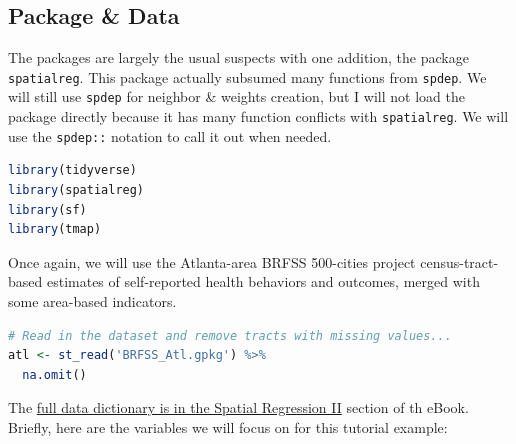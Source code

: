 \documentclass[
]{book}
\newcommand{\passthrough}[1]{#1}
\begin{document}
\hypertarget{package-data}{%
\subsection{Package \& Data}\label{package-data}}

The packages are largely the usual suspects with one addition, the package \passthrough{\lstinline!spatialreg!}. This package actually subsumed many functions from \passthrough{\lstinline!spdep!}. We will still use \passthrough{\lstinline!spdep!} for neighbor \& weights creation, but I will not load the package directly because it has many function conflicts with \passthrough{\lstinline!spatialreg!}. We will use the \passthrough{\lstinline!spdep::!} notation to call it out when needed.

\begin{lstlisting}[language=R]
library(tidyverse)
library(spatialreg)
library(sf)
library(tmap)
\end{lstlisting}

Once again, we will use the Atlanta-area BRFSS 500-cities project census-tract-based estimates of self-reported health behaviors and outcomes, merged with some area-based indicators.

\begin{lstlisting}[language=R]
# Read in the dataset and remove tracts with missing values...
atl <- st_read('BRFSS_Atl.gpkg') %>%
  na.omit() 
\end{lstlisting}

The \protect\hyperlink{brfss-data}{full data dictionary is in the Spatial Regression II} section of th eBook. Briefly, here are the variables we will focus on for this tutorial example:
\end{document}
